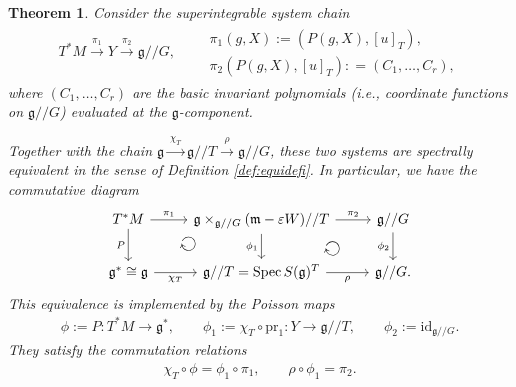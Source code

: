 \documentclass[11pt,reqno]{amsart}
\newtheorem*{theorem A}{Main Theorem A}
\newtheorem*{theorem B}{Main Theorem B}
\newtheorem*{theorem C}{Main Theorem C}
\newtheorem*{theorem D}{Main Theorem D}
\newtheorem{theorem}{Theorem}[section]
\theoremstyle{definition}
\theoremstyle{plain}
\theoremstyle{conclusion}
\begin{document}
\begin{theorem}
\label{thm:spectralequivalent}
Consider the superintegrable system chain
\begin{align*}
T^*M \xrightarrow{\ \pi_1\ }Y \xrightarrow{\ \pi_2\ } \mathfrak{g}//G, \qquad \begin{matrix}
    \pi_1(g,X):=\left(P(g,X),[u]_T\right), \\
    \pi_2\left(P(g,X),[u]_T\right) : = (C_1,\ldots,C_r),
\end{matrix}
\end{align*}
where $(C_1,\ldots,C_r)$ are the basic invariant polynomials (i.e., coordinate functions on $\mathfrak{g}//G$) evaluated at the $\mathfrak{g}$-component.

Together with the chain $\mathfrak{g} \xrightarrow{\ \chi_T\ } \mathfrak{g}//T \xrightarrow{\ \rho\ } \mathfrak{g}//G$, these two systems are spectrally equivalent in the sense of Definition \ref{def:equidefi}. In particular, we have the commutative diagram
\[\begin{tikzcd}
	{T^*M} & {\mathfrak{g} \times_{\mathfrak{g}//G} (\mathfrak{m} - \varepsilon W)//T} & {\mathfrak{g}//G} \\
	{\mathfrak{g}^* \cong \mathfrak{g}} & {\mathfrak{g}//T=\mathrm{Spec} \, S(\mathfrak{g})^T} & {\mathfrak{g}//G}
	\arrow["{\pi_1}", from=1-1, to=1-2]
	\arrow["{P}"', from=1-1, to=2-1]
	\arrow["{\pi_2}", from=1-2, to=1-3]
	\arrow["{\phi_1}"', from=1-2, to=2-2]
	\arrow["{\phi_2}"', from=1-3, to=2-3]
	\arrow["{\chi_T}"', from=2-1, to=2-2]
	\arrow["\rho"', from=2-2, to=2-3]
    \arrow[from=1-1, to=2-2, phantom, "\circlearrowright" {anchor=center, scale=1.5, rotate=90}]
    \arrow[from=1-2, to=2-3, phantom, "\circlearrowright" {anchor=center, scale=1.5, rotate=90}].
\end{tikzcd}\]
This equivalence is implemented by the Poisson maps \begin{align}
\phi:=P:T^* M \rightarrow  \mathfrak{g}^*,\qquad \phi_1:=\chi_T\circ \mathrm{pr}_1:Y  \rightarrow  \mathfrak{g}//T,\qquad \phi_2:=\mathrm{id}_{\mathfrak{g}//G}.  \label{eq:mp}
\end{align}
They satisfy the commutation relations
\begin{align*}
\chi_T\circ \phi=\phi_1\circ \pi_1,\qquad \rho\circ \phi_1=\pi_2.
\end{align*}
\end{theorem}
 
\end{document}
